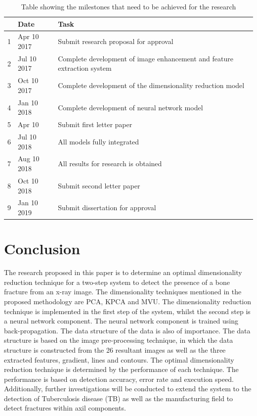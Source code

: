 \documentclass[11pt,twocolumn]{witseiepaper}
\begin{document}
	\begin{table}[!h]
		\centering
		\caption{Table showing the milestones that need to be achieved for the research}
		\label{tb: milestones}
		\begin{tabular}{| c | l | p{5cm} |}
			\hline 
			& Date & Task \\
			\hline \hline
			1 & Apr 10 2017 & Submit research proposal for approval\\
			\hline
			2 & Jul 10 2017 & Complete development of image enhancement and feature extraction system \\
			\hline
			3 & Oct 10 2017 & Complete development of the dimensionality reduction model \\
			\hline
			4 & Jan 10 2018 & Complete development of neural network model \\
			\hline
			5 & Apr 10 & Submit first letter paper \\
			\hline
			6 & Jul 10 2018 & All models fully integrated \\
			\hline
			7 & Aug 10 2018 & All results for research is obtained \\
			\hline
			8 & Oct 10 2018 & Submit second letter paper \\
			\hline
			9 & Jan 10 2019 & Submit dissertation for approval \\
			\hline
		\end{tabular}
	\end{table}

	\section{Conclusion}
	\label{sc: Conclusion}
	The research proposed in this paper is to determine an optimal dimensionality reduction technique for a two-step system to detect the presence of a bone fracture from an x-ray image. The dimensionality techniques mentioned in the proposed methodology are PCA, KPCA and MVU. The dimensionality reduction technique is implemented in the first step of the system, whilst the second step is a neural network component. The neural network component is trained using back-propagation. The data structure of the data is also of importance. The data structure is based on the image pre-processing technique, in which the data structure is constructed from the 26 resultant images as well as the three extracted features, gradient, lines and contours. The optimal dimensionality reduction technique is determined by the performance of each technique. The performance is based on detection accuracy, error rate and execution speed. Additionally, further investigations will be conducted to extend the system to the detection of Tuberculosis disease (TB) as well as the manufacturing field to detect fractures within axil components.
	
	
	
	
\end{document}
